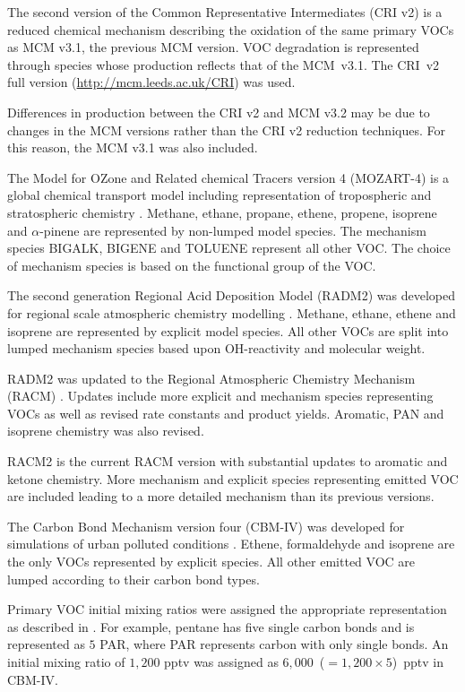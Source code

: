 The second version of the Common Representative Intermediates (CRI v2) \citep{Jenkin:2008} is a reduced chemical mechanism describing the oxidation of the same primary VOCs as MCM v3.1, the previous MCM version. 
VOC degradation is represented through species whose  production reflects that of the \mbox{MCM v3.1}. 
The \mbox{CRI v2} full version (\url{http://mcm.leeds.ac.uk/CRI}) was used.

Differences in  production between the CRI v2 and MCM v3.2 may be due to changes in the MCM versions rather than the CRI v2 reduction techniques.
For this reason, the MCM v3.1 was also included.

The Model for OZone and Related chemical Tracers version 4 (MOZART-4) is a global chemical transport model including representation of tropospheric and stratospheric chemistry \citep{Emmons:2010}. 
Methane, ethane, propane, ethene, propene, isoprene and $\alpha$-pinene are represented by non-lumped model species. 
The mechanism species BIGALK, BIGENE and TOLUENE represent all other VOC. 
The choice of mechanism species is based on the functional group of the VOC.

The second generation Regional Acid Deposition Model (RADM2) was developed for regional scale atmospheric chemistry modelling \citep{Stockwell:1990}. 
Methane, ethane, ethene and isoprene are represented by explicit model species. 
All other VOCs are split into lumped mechanism species based upon OH-reactivity and molecular weight.

RADM2 was updated to the Regional Atmospheric Chemistry Mechanism (RACM) \citep{Stockwell:1997}. 
Updates include more explicit and mechanism species representing VOCs as well as revised rate constants and product yields. 
Aromatic, PAN and isoprene chemistry was also revised.

RACM2 is the current RACM version \citep{Goliff:2013} with substantial updates to aromatic and ketone chemistry. 
More mechanism and explicit species representing emitted VOC are included leading to a more detailed mechanism than its previous versions.

The Carbon Bond Mechanism version four (CBM-IV) was developed for simulations of urban polluted conditions \citep{Gery:1989}. 
Ethene, formaldehyde and isoprene are the only VOCs represented by explicit species. 
All other emitted VOC are lumped according to their carbon bond types. 

Primary VOC initial mixing ratios were assigned the appropriate representation as described in \citet{Hogo:1989}. 
For example, pentane has five single carbon bonds and is represented as $5$ PAR, where PAR represents carbon with only single bonds. 
An initial mixing ratio of $1,200$ pptv was assigned as \mbox{$6,000$ ($= 1,200 \times 5$) pptv} in CBM-IV.

